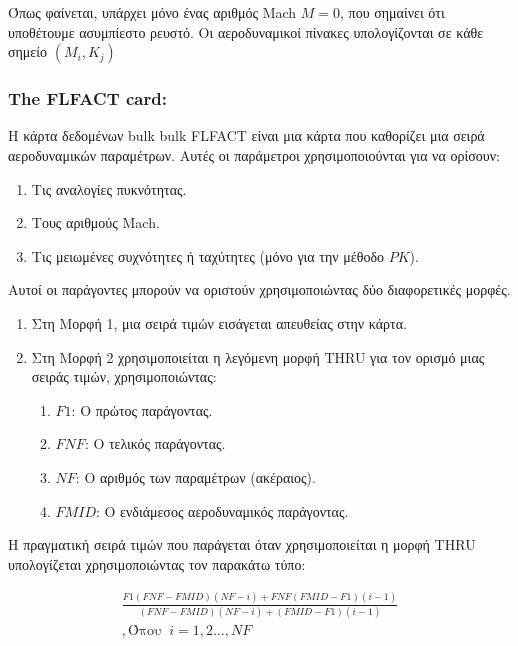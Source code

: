 Όπως φαίνεται, υπάρχει μόνο ένας αριθμός \textlatin{Mach} \(M = 0\), που σημαίνει ότι υποθέτουμε ασυμπίεστο ρευστό. Οι αεροδυναμικοί πίνακες υπολογίζονται σε κάθε σημείο \(\left( M_{i}, K_{j} \right)\)

\subsubsection{\textlatin{The FLFACT card:}}

Η κάρτα δεδομένων bulk \textlatin{bulk FLFACT} είναι μια κάρτα που καθορίζει μια σειρά αεροδυναμικών παραμέτρων. Αυτές οι παράμετροι χρησιμοποιούνται για να ορίσουν:

\begin{enumerate}
\def\labelenumi{\arabic{enumi}.}
\item
  Τις αναλογίες πυκνότητας.
\item
  Τους αριθμούς \textlatin{Mach}.
\item
  Τις μειωμένες συχνότητες ή ταχύτητες (μόνο για την μέθοδο $PK$).
\end{enumerate}

Αυτοί οι παράγοντες μπορούν να οριστούν χρησιμοποιώντας δύο διαφορετικές μορφές.

\begin{enumerate}
\def\labelenumi{\arabic{enumi}.}
\item
  Στη Μορφή 1, μια σειρά τιμών εισάγεται απευθείας στην κάρτα.
\item
  Στη Μορφή 2 χρησιμοποιείται η λεγόμενη μορφή \textlatin{THRU} για τον ορισμό μιας σειράς τιμών, χρησιμοποιώντας:

  \begin{enumerate}
  \def\labelenumii{\alph{enumii}.}
  \item
    $F1$: Ο πρώτος παράγοντας.
  \item
    $FNF$: Ο τελικός παράγοντας.
  \item
    $NF$: Ο αριθμός των παραμέτρων (ακέραιος).
  \item
    $FMID$: Ο ενδιάμεσος αεροδυναμικός παράγοντας.
  \end{enumerate}
\end{enumerate}

Η πραγματική σειρά τιμών που παράγεται όταν χρησιμοποιείται η μορφή \textlatin{THRU} υπολογίζεται χρησιμοποιώντας τον παρακάτω τύπο:


\begin{multline}
\frac{F1(FNF - FMID)(NF - i) + FNF(FMID - F1)(i - 1)}{(FNF - FMID)(NF - i) + (FMID - F1)(i - 1)}\\ , \text{Όπου }\ i = 1,2\ldots,NF
\end{multline}

